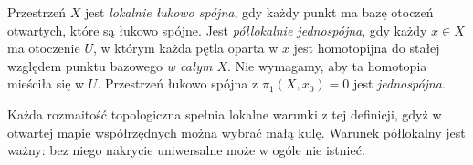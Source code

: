 \begin{definicja}
\label{def:semilokalnie-prosto-spojna}
Przestrzeń $X$ jest \emph{lokalnie łukowo spójna},
gdy każdy punkt ma bazę otoczeń otwartych,
które są łukowo spójne. Jest
\emph{półlokalnie jednospójna}, gdy każdy
$x\in X$ ma otoczenie $U$, w którym
każda pętla oparta w $x$ jest homotopijna do stałej
względem punktu bazowego \emph{w całym $X$}. Nie wymagamy, aby
ta homotopia mieściła się w $U$.
Przestrzeń łukowo spójna z
$\pi_1(X,x_0)=0$ jest \emph{jednospójna}.
\end{definicja}

Każda rozmaitość topologiczna spełnia
lokalne warunki z tej definicji, gdyż
w otwartej mapie współrzędnych można
wybrać małą kulę. Warunek półlokalny
jest ważny: bez niego nakrycie uniwersalne
może w ogóle nie istnieć.

